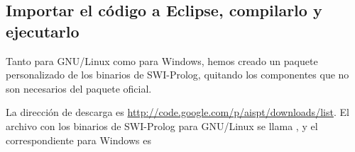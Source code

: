 \subsection{Importar el código a Eclipse, compilarlo y ejecutarlo\label{sec:inst}}

Tanto para GNU/Linux como para Windows, hemos creado un paquete personalizado
de los binarios de SWI-Prolog, quitando los componentes que no son necesarios
del paquete oficial.

La dirección de descarga es
\href{http://code.google.com/p/aispt/downloads/list}{http://code.google.com/p/aispt/downloads/list}.
El archivo con los binarios de SWI-Prolog para
GNU/Linux se llama \linebreak{}, y el
correspondiente para Windows es \linebreak{}

